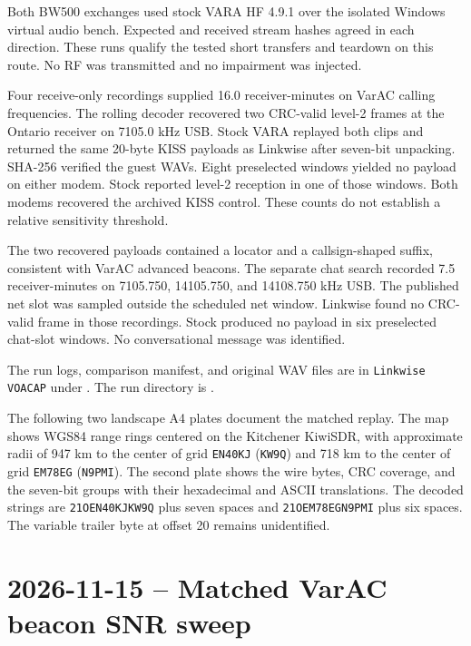 \documentclass[11pt,a4paper]{article}
\newcommand{\pathtext}[1]{\path{#1}}
\begin{document}
Both BW500 exchanges used stock VARA HF 4.9.1 over the isolated Windows
virtual audio bench. Expected and received stream hashes agreed in
each direction. These runs qualify the tested short transfers and
teardown on this route. No RF was transmitted and no impairment was
injected.

Four receive-only recordings supplied 16.0 receiver-minutes on VarAC
calling frequencies. The rolling decoder recovered two CRC-valid
level-2 frames at the Ontario receiver on 7105.0 kHz USB. Stock VARA
replayed both clips and returned the same 20-byte KISS payloads as
Linkwise after seven-bit unpacking. SHA-256 verified the guest WAVs.
Eight preselected windows yielded no payload on either modem. Stock
reported level-2 reception in one of those windows. Both modems
recovered the archived KISS control. These counts do not establish
a relative sensitivity threshold.

The two recovered payloads contained a locator and a callsign-shaped
suffix, consistent with VarAC advanced beacons. The separate chat
search recorded 7.5 receiver-minutes on 7105.750, 14105.750, and
14108.750 kHz USB. The published net slot was sampled outside the
scheduled net window. Linkwise found no CRC-valid frame in those
recordings. Stock produced no payload in six preselected chat-slot
windows. No conversational message was identified.

The run logs, comparison manifest, and original WAV files are in
\texttt{Linkwise VOACAP} under \pathtext{~/Documents/Codex}.
The run directory is
\pathtext{2026-11-15-main-retest.sajUbP}.

The following two landscape A4 plates document the matched replay.
The map shows WGS84 range rings centered on the Kitchener KiwiSDR,
with approximate radii of 947 km to the center of grid \texttt{EN40KJ}
(\texttt{KW9Q}) and 718 km to the center of grid \texttt{EM78EG}
(\texttt{N9PMI}). The second plate shows the wire bytes, CRC coverage,
and the seven-bit groups with their hexadecimal and ASCII translations.
The decoded strings are \texttt{21OEN40KJKW9Q} plus seven spaces and
\texttt{21OEM78EGN9PMI} plus six spaces. The variable trailer byte at
offset 20 remains unidentified.



\section{2026-11-15 -- Matched VarAC beacon SNR sweep}
\end{document}
